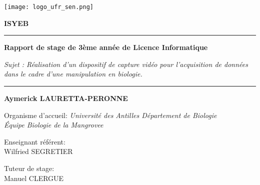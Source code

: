 \begin{titlepage}
    \begin{center}
        \vspace*{0.5cm}

        \texttt{[image: logo\_ufr\_sen.png]}
        \hspace{2cm}

        \vspace{0.5cm}

        \textbf{\Huge{ISYEB}}

        \vspace{0.5cm}

        \rule{\linewidth}{0.5mm}
        \textbf{Rapport de stage de 3ème année de Licence Informatique} 
        
        \vspace{0.2cm}

        \small{\textit{Sujet : Réalisation d'un dispositif de capture vidéo pour l’acquisition de données dans le cadre d’une manipulation en biologie.}}
        \rule{\linewidth}{0.5mm}

        \vspace{2cm}
    
        \textbf{Aymerick LAURETTA-PERONNE} \\

        \vfill
                
		{\large Organisme d'accueil: \textsl{Université des Antilles Département de Biologie}} \\[0.1cm]
        \small{\textit{Équipe Biologie de la Mangrovee}} \\[1cm]
    
		\begin{minipage}{0.7\textwidth}
			\begin{flushleft}
				Enseignant référent: \\ 
				\hspace{0.2cm} Wilfried \textsc{SEGRETIER}
			\end{flushleft}
		\end{minipage}
        
		\vspace{-0.69cm}
		\hspace{9cm}
		\begin{minipage}{0.3\textwidth}
			\begin{flushleft}
				Tuteur de stage: \\
				\hspace{0.2cm} Manuel \textsc{CLERGUE}


\end{flushleft}
\end{minipage}
\end{center}
\end{titlepage}

